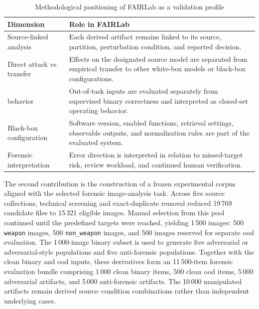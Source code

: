 \begin{table}[H]
\centering
\small
\renewcommand{\arraystretch}{1.15}
\begin{tabularx}{\textwidth}{@{}L{0.27\textwidth}Y@{}}
\toprule
\textbf{Dimension} & \textbf{Role in FAIRLab} \\
\midrule
Source-linked analysis &
Each derived artifact remains linked to its source, partition, perturbation
condition, and reported decision. \\
Direct attack vs transfer &
Effects on the designated source model are separated from empirical transfer
to other white-box models or black-box configurations. \\
 behavior &
Out-of-task inputs are evaluated separately from supervised binary correctness
and interpreted as closed-set operating behavior. \\
Black-box configuration &
Software version, enabled functions, retrieval settings, observable outputs,
and normalization rules are part of the evaluated system. \\
Forensic interpretation &
Error direction is interpreted in relation to missed-target risk, review
workload, and continued human verification. \\
\bottomrule
\end{tabularx}
\caption{Methodological positioning of FAIRLab as a validation profile}
\label{tab:introduction-fairlab-validation-profile}
\end{table}

The second contribution is the construction of a frozen experimental corpus
aligned with the selected forensic image-analysis task. Across five source
collections, technical screening and exact-duplicate removal reduced 19\,769
candidate files to 15\,321 eligible images. Manual selection from this pool
continued until the predefined targets were reached, yielding 1\,500 images:
500 \texttt{weapon} images, 500 \texttt{non\_weapon} images, and 500 images
reserved for separate \gls{ood} evaluation.
The 1\,000-image binary subset is used to generate five
adversarial or adversarial-style populations and five anti-forensic populations.
Together with the clean binary and \gls{ood} inputs, these derivatives form an
11\,500-item forensic evaluation bundle comprising 1\,000 clean binary items,
500 clean \gls{ood} items, 5\,000 adversarial artifacts, and 5\,000
anti-forensic artifacts. The 10\,000 manipulated artifacts remain derived
source--condition combinations rather than independent underlying cases.

